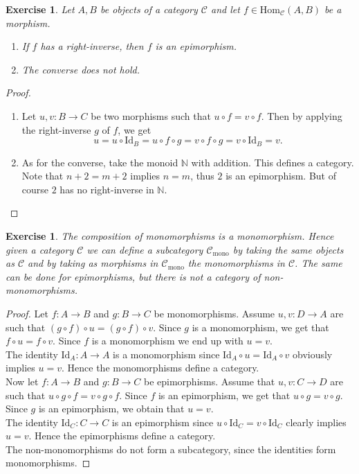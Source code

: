 \documentclass[a4paper, 11pt]{book}
\theoremstyle{plain}
\newtheorem{exercise}[theorem]{Exercise}
\theoremstyle{plain}
\begin{document}
\begin{exercise}
Let $A,B$ be objects of a category $\mathcal{C}$ and let $f\in \text{Hom}_\mathcal{C}(A,B)$ be a morphism.
\begin{enumerate}
    \item If $f$ has a right-inverse, then $f$ is an epimorphism.
    \item The converse does not hold.
\end{enumerate}
\end{exercise}
\begin{proof}
\begin{enumerate}
    \item Let $u,v:B\rightarrow C$ be two morphisms such that $u\circ f = v\circ f$. Then by applying the right-inverse $g$ of $f$, we get
    $$u = u\circ \text{Id}_B = u\circ f\circ g = v\circ f\circ g = v\circ \text{Id}_B = v.$$
    
    \item As for the converse, take the monoid $\mathbb{N}$ with addition. This defines a category. Note that $n+2 = m + 2$ implies $n=m$, thus $2$ is an epimorphism. But of course $2$ has no right-inverse in $\mathbb{N}$.
\end{enumerate}
\end{proof}

\begin{exercise}
The composition of monomorphisms is a monomorphism. Hence given a category $\mathcal{C}$ we can define a subcategory $\mathcal{C}_\text{mono}$ by taking the same objects as $\mathcal{C}$ and by taking as morphisms in $\mathcal{C}_\text{mono}$ the monomorphisms in $\mathcal{C}$. The same can be done for epimorphisms, but there is not a category of non-monomorphisms.
\end{exercise}
\begin{proof}
Let $f:A\rightarrow B$ and $g:B\rightarrow C$ be monomorphisms. Assume $u,v:D\rightarrow A$ are such that $(g\circ f)\circ u = (g\circ f)\circ v$. Since $g$ is a monomorphism, we get that $f\circ u = f\circ v$. Since $f$ is a monomorphism we end up with $u=v$.\\
The identity $\text{Id}_A:A\rightarrow A$ is a monomorphism since $\text{Id}_A\circ u = \text{Id}_A\circ v$ obviously implies $u=v$. Hence the monomorphisms define a category.\\
Now let $f:A\rightarrow B$ and $g:B\rightarrow C$ be epimorphisms. Assume that $u,v:C\rightarrow D$ are such that $u\circ g\circ f = v\circ g\circ f$. Since $f$ is an epimorphism, we get that $u\circ g = v\circ g$. Since $g$ is an epimorphism, we obtain that $u=v$.\\
The identity $\text{Id}_C:C\rightarrow C$ is an epimorphism since $u\circ\text{Id}_C=v\circ \text{Id}_C$ clearly implies $u=v$. Hence the epimorphisms define a category.\\
The non-monomorphisms do not form a subcategory, since the identities form monomorphisms. 
\end{proof}
\end{document}
